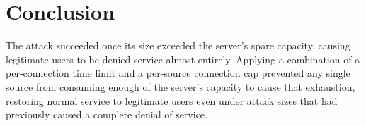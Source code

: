 \documentclass[11pt]{article}
\begin{document}
\section{Conclusion}

The attack succeeded once its size exceeded the server's spare capacity,
causing legitimate users to be denied service almost entirely. Applying
a combination of a per-connection time limit and a per-source connection
cap prevented any single source from consuming enough of the server's
capacity to cause that exhaustion, restoring normal service to
legitimate users even under attack sizes that had previously caused a
complete denial of service.
\end{document}
